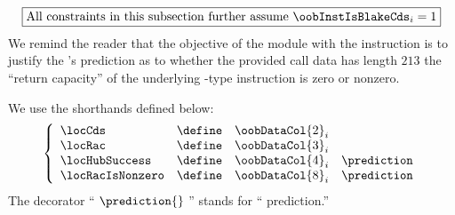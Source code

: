 \[
	\boxed{\text{All constraints in this subsection further assume } \oobInstIsBlakeCds_{i} = 1}
\]
We remind the reader that the objective of the \oobMod{} module with the \oobInstBlakeCds{} instruction is to justify the \hubMod{}'s prediction as to whether
 the provided call data has length $213$
 the ``return capacity'' of the underlying -type instruction is zero or nonzero.

We use the shorthands defined below:
\[
	\left\{ \begin{array}{lclr}
		\locCds          & \define & \oobDataCol {2} _{i} \\
		\locRac          & \define & \oobDataCol {3} _{i} \\
		\locHubSuccess   & \define & \oobDataCol {4} _{i}  & \prediction \\
		\locRacIsNonzero & \define & \oobDataCol {8} _{i}  & \prediction \\
	\end{array} \right.
\]
\saNote{} The decorator `` $\prediction{}$ '' stands for ``\hubMod{} prediction.''

